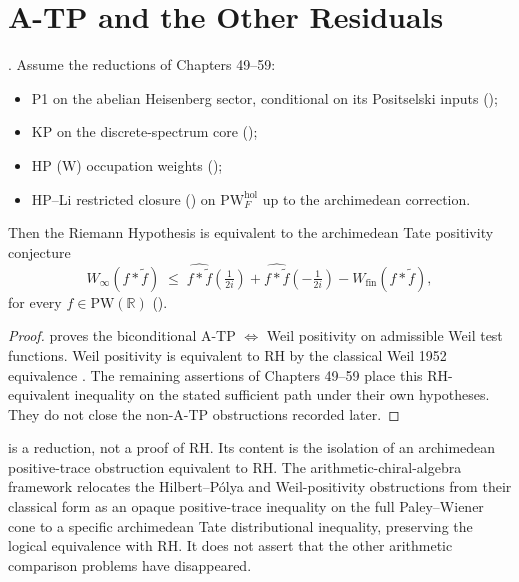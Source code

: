 \section{A-TP and the Other Residuals}
\label{v4-arith:w5-synth:single-residual}

\begin{theorem}
\label{v4-arith:w5-synth:thm:RH-equiv-ATP}
\ClaimStatusProvedHereConditional. Assume the reductions of Chapters 49--59:
\begin{itemize}
\item P1 on the abelian Heisenberg sector, conditional on its
Positselski inputs
();
\item KP on the discrete-spectrum core
();
\item HP (W) occupation weights
();
\item HP--Li restricted closure
() on
\(\mathrm{PW}^{\mathrm{hol}}_{F}\) up to the archimedean correction.
\end{itemize}
Then the Riemann Hypothesis is equivalent to the archimedean Tate
positivity conjecture
\begin{equation}
\label{v4-arith:w5-synth:eq:ATP}
W_{\infty}(f*\widetilde{f})\;\leq\;
\widehat{f*\widetilde{f}}(\tfrac{1}{2i})+
\widehat{f*\widetilde{f}}(-\tfrac{1}{2i})-
W_{\mathrm{fin}}(f*\widetilde{f}),
\end{equation}
for every \(f\in\mathrm{PW}(\mathbb{R})\)
().
\end{theorem}

\begin{proof}
 proves the
biconditional A-TP \(\Leftrightarrow\) Weil positivity on admissible
Weil test functions. Weil positivity is equivalent to RH by the
classical Weil 1952 equivalence
. The remaining assertions
of Chapters 49--59 place this RH-equivalent inequality on the stated
sufficient path under their own hypotheses. They do not close the
non-A-TP obstructions recorded later.
\end{proof}

\begin{remark}[Reduction to A-TP]
\label{v4-arith:w5-synth:rem:honest-reduction}
 is a reduction, not a
proof of RH. Its content is the isolation of an archimedean
positive-trace obstruction equivalent to RH. The
arithmetic-chiral-algebra framework relocates the Hilbert--P\'{o}lya
and Weil-positivity obstructions from their classical form as an
opaque positive-trace inequality on the full Paley--Wiener cone to a
specific archimedean Tate distributional inequality, preserving the
logical equivalence with RH.  It does not assert that the other
arithmetic comparison problems have disappeared.
\end{remark}

